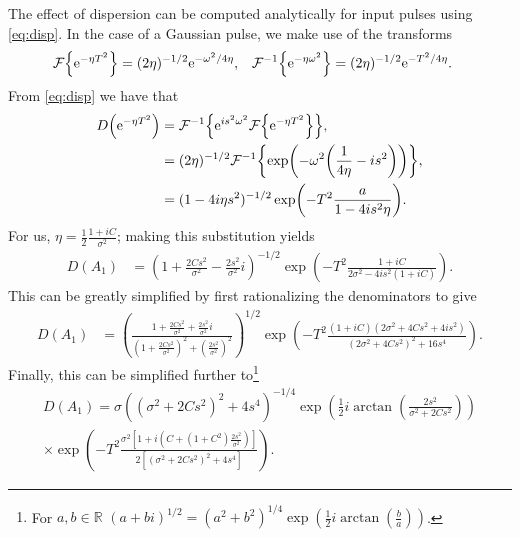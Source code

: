 The effect of dispersion can be computed analytically for input pulses using \eqref{eq:disp}. In the case of a Gaussian pulse, we make use of the transforms \cite{debnath, gradshteyn}
\begin{align*}
\FT{\textrm{e}^{-\eta T^2}} &= (2 \eta)^{-1/2}\textrm{e}^{-\omega^2/4\eta},& \FTi{\textrm{e}^{-\eta \omega^2}} &= (2 \eta)^{-1/2}\textrm{e}^{-T^2/4\eta}.
\end{align*}
From \eqref{eq:disp} we have that
\begin{align*}
D \left( \textrm{e}^{-\eta T^2} \right) &=\FTi{\textrm{e}^{i s^2 \omega^2} \FT{\textrm{e}^{-\eta T^2}}}, \\
&= (2 \eta)^{-1/2} \FTi{\exp \left( -\omega^2 \left( \frac{1}{4\eta} - i s^2 \right) \right)}, \\
&= (1 - 4 i \eta s^2)^{-1/2} \exp \left( -T^2 \frac{a}{1 - 4 i s^2 \eta} \right).
\end{align*}
For us, $\displaystyle \eta = \frac{1}{2} \frac{1 + i C}{\sigma^2}$; making this substitution yields
\begin{align*}
D(A_1) &= \left( 1 + \frac{2C s^2}{\sigma^2} - \frac{2s^2}{\sigma^2}i \right)^{-1/2} \exp \left( -T^2 \frac{1 + i C}{2\sigma^2 - 4 i s^2 (1 + i C)} \right).
\end{align*}
This can be greatly simplified by first rationalizing the denominators to give
\begin{align*}
D(A_1) &= \left( \frac{1 + \frac{2C s^2}{\sigma^2} + \frac{2s^2}{\sigma^2}i}{\left( 1 + \frac{2C s^2}{\sigma^2} \right)^2 + \left( \frac{2s^2}{\sigma^2} \right)^2} \right)^{1/2} \exp \left( -T^2 \frac{(1 + i C)(2\sigma^2 + 4 C s^2 + 4 i s^2)}{(2\sigma^2 + 4C s^2)^2 + 16s^4} \right).
\end{align*}
Finally, this can be simplified further to\footnote{For $a, b \in \mathbb{R}$ $\displaystyle (a + bi)^{1/2} = (a^2 + b^2)^{1/4} \exp \left( \frac{1}{2}i \arctan \left( \frac{b}{a} \right) \right)$.}
\begin{multline*}
D(A_1) = \sigma \left( \left( \sigma^2 + 2C s^2 \right)^2 + 4s^4 \right)^{-1/4} \exp \left( \frac{1}{2} i \arctan \left( \frac{2s^2}{\sigma^2 + 2C s^2} \right) \right) \\
\times \exp \left( -T^2 \frac{\sigma^2 \left[ 1 + i \left( C + (1 + C^2) \frac{2s^2}{\sigma^2} \right) \right]}{2 \left[ (\sigma^2 + 2C s^2)^2 + 4s^4 \right]} \right).
\end{multline*}
